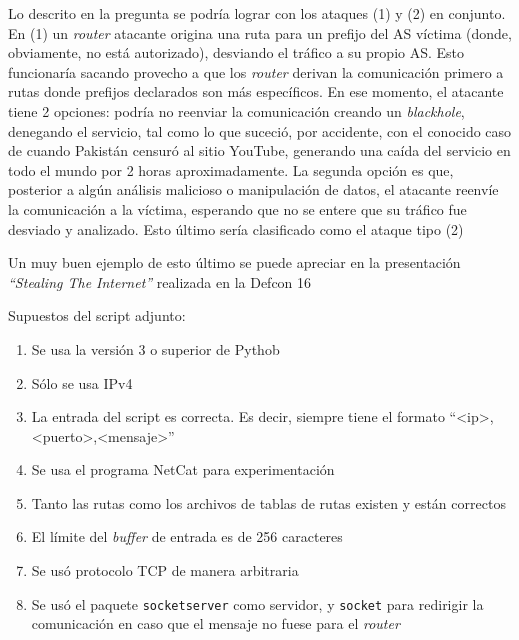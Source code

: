 \documentclass{article}
\begin{document}
Lo descrito en la pregunta se podría lograr con los ataques (1) y (2) en conjunto. En (1) un \textit{router} atacante origina una ruta para un prefijo del AS víctima (donde, obviamente, no está autorizado), desviando el tráfico a su propio AS. Esto funcionaría sacando provecho a que los \textit{router} derivan la comunicación primero a rutas donde prefijos declarados son más específicos. En ese momento, el atacante tiene 2 opciones: podría no reenviar la comunicación creando un \textit{blackhole}, denegando el servicio, tal como lo que suceció, por accidente, con el conocido caso de cuando Pakistán censuró al sitio YouTube, generando una caída del servicio en todo el mundo por 2 horas aproximadamente. La segunda opción es que, posterior a algún análisis malicioso o manipulación de datos, el atacante reenvíe la comunicación a la víctima, esperando que no se entere que su tráfico fue desviado y analizado. Esto último sería clasificado como el ataque tipo (2)

Un muy buen ejemplo de esto último se puede apreciar en la presentación \textit{``Stealing The Internet''} realizada en la Defcon 16\cite{defcon16}

Supuestos del script adjunto:
\begin{enumerate}
\item Se usa la versión 3 o superior de Pythob
\item Sólo se usa IPv4
\item La entrada del script es correcta. Es decir, siempre tiene el formato ``<ip>,<puerto>,<mensaje>''
\item Se usa el programa NetCat para experimentación
\item Tanto las rutas como los archivos de tablas de rutas existen y están correctos
\item El límite del \textit{buffer} de entrada es de 256 caracteres
\item Se usó protocolo TCP de manera arbitraria
\item Se usó el paquete \texttt{socketserver} como servidor, y \texttt{socket} para redirigir la comunicación en caso que el mensaje no fuese para el \textit{router}
\end{enumerate}

%
\end{document}

